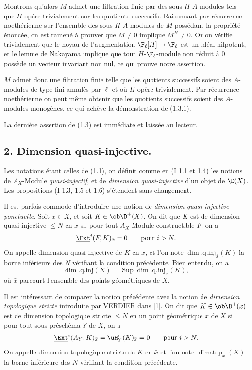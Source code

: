 Montrons qu'alors $M$ admet une filtration finie par des sous-$H$-$A$-modules tels que $H$ opère trivialement sur les quotients successifs. Raisonnant par récurrence noethérienne sur l'ensemble des sous-$H$-$A$-modules de $M$ possédant la propriété énoncée, on est ramené à prouver que $M\neq0$ implique $M^H\neq0$. Or on vérifie trivialement que le noyau de l'augmentation $\F_\ell[H]\to\F_\ell$ est un idéal nilpotent, et le lemme de Nakayama implique que tout $H$-$\F_\ell$-module non réduit à $0$ possède un vecteur invariant non nul, ce qui prouve notre assertion.

$M$ admet donc une filtration finie telle que les quotients successifs soient des $A$-modules de type fini annulés par $\ell$ et où $H$ opère trivialement. Par récurrence noethérienne on peut même obtenir que les quotients successifs soient des $A$-modules monogènes, ce qui achève la démonstration de (1.3.1).

La dernière assertion de (1.3) est immédiate et laissée au lecteur.

\subsection*{2. Dimension quasi-injective.}

Les notations étant celles de (1.1), on définit comme en (I 1.1 et 1.4) les notions de $A_X$-Module \emph{quasi-injectif}, et de \emph{dimension quasi-injective} d'un objet de $\D(X)$. Les propositions (I 1.3, 1.5 et 1.6) s'étendent sans changement.

Il est parfois commode d'introduire une notion de \emph{dimension quasi-injective ponctuelle}. Soit $x\in X$, et soit $K\in\ob \D^+(X)$. On dit que $K$ est de dimension quasi-injective $\leq N$ en $\bar{x}$ si, pour tout $A_X$-Module constructible $F$, on a
\[
        \underline{\Ext}^{i}(F,K)_{\bar{x}}=0\qquad\hbox{pour }i>N.
\]
On appelle dimension quasi-injective de $K$ en $\bar{x}$, et l'on note $\dim.\mathrm{q.inj}_{\bar{x}}(K)$ la borne inférieure des $N$ vérifiant la condition précédente. Bien entendu, on a
\[
        \dim.\mathrm{q.inj}(K)=\operatorname{Sup}\dim.\mathrm{q.inj}_{\bar{x}}(K),
\]
où $\bar{x}$ parcourt l'ensemble des points géométriques de $X$.

Il est intéressant de comparer la notion précédente avec la notion de \emph{dimension topologique stricte} introduite par VERDIER dans [1]. On dit que $K\in\ob \D^+(x)$ est de dimension topologique stricte $\leq N$ en un point géométrique $\bar{x}$ de $X$ si pour tout sous-préschéma $Y$ de $X$, on a
\[
        \underline{\Ext}^{i}(A_Y,K)_{\bar{x}}=\uH^i_Y(K)_{\bar{x}}=0\qquad\hbox{pour }i>N.
\]
On appelle dimension topologique stricte de $K$ en $\bar{x}$ et l'on note $\operatorname{dimstop}_{\bar{x}}(K)$ la borne inférieure des $N$ vérifiant la condition précédente.

